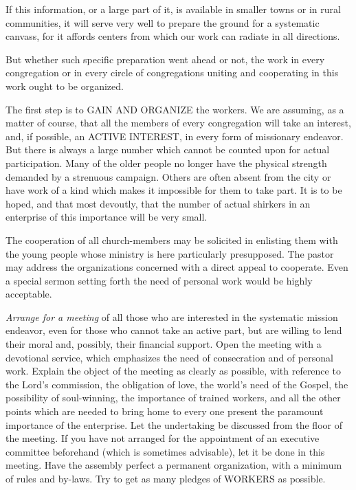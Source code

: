 \documentclass[
]{book}
\begin{document}
If this information, or a large part of it, is available in smaller towns or in rural communities, it will serve very well to prepare the ground for a systematic canvass, for it affords centers from which our work can radiate in all directions.

But whether such specific preparation went ahead or not, the work in every congregation or in every circle of congregations uniting and cooperating in this work ought to be organized.

The first step is to GAIN AND ORGANIZE the workers. We are assuming, as a matter of course, that all the members of every congregation will take an interest, and, if possible, an ACTIVE INTEREST, in every form of missionary endeavor. But there is always a large number which cannot be counted upon for actual participation. Many of the older people no longer have the physical strength demanded by a strenuous campaign. Others are often absent from the city or have work of a kind which makes it impossible for them to take part. It is to be hoped, and that most devoutly, that the number of actual shirkers in an enterprise of this importance will be very small.

The cooperation of all church-members may be solicited in enlisting them with the young people whose ministry is here particularly presupposed. The pastor may address the organizations concerned with a direct appeal to cooperate. Even a special sermon setting forth the need of personal work would be highly acceptable.

\emph{Arrange for a meeting} of all those who are interested in the systematic mission endeavor, even for those who cannot take an active part, but are willing to lend their moral and, possibly, their financial support. Open the meeting with a devotional service, which emphasizes the need of consecration and of personal work. Explain the object of the meeting as clearly as possible, with reference to the Lord's commission, the obligation of love, the world's need of the Gospel, the possibility of soul-winning, the importance of trained workers, and all the other points which are needed to bring home to every one present the paramount importance of the enterprise. Let the undertaking be discussed from the floor of the meeting. If you have not arranged for the appointment of an executive committee beforehand (which is sometimes advisable), let it be done in this meeting. Have the assembly perfect a permanent organization, with a minimum of rules and by-laws. Try to get as many pledges of WORKERS as possible.
\end{document}
